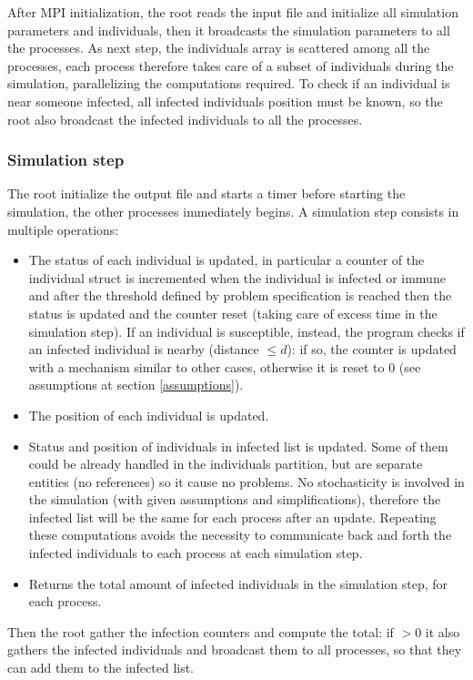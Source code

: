 \documentclass[10pt]{article}
\begin{document}
	After MPI initialization, the root reads the input file and initialize all simulation parameters and individuals, then it broadcasts the simulation parameters to all the processes. As next step, the individuals array is scattered among all the processes, each process therefore takes care of a subset of individuals during the simulation, parallelizing the computations required. To check if an individual is near someone infected, all infected individuals position must be known, so the root also broadcast the infected individuals to all the processes.
	
	\subsubsection{Simulation step}
	The root initialize the output file and starts a timer before starting the simulation, the other processes immediately begins. A simulation step consists in multiple operations:
	\begin{itemize}
		\item The status of each individual is updated, in particular a counter of the individual struct is incremented when the individual is infected or immune and after the threshold defined by problem specification is reached then the status is updated and the counter reset (taking care of excess time in the simulation step). If an individual is susceptible, instead, the program checks if an infected individual is nearby (distance $ \le d $): if so, the counter is updated with a mechanism similar to other cases, otherwise it is reset to 0 (see assumptions at section \ref{assumptions}).
		\item The position of each individual is updated.
		\item Status and position of individuals in infected list is updated. Some of them could be already handled in the individuals partition, but are separate entities (no references) so it cause no problems. No stochasticity is involved in the simulation (with given assumptions and simplifications), therefore the infected list will be the same for each process after an update. Repeating these computations avoids the necessity to communicate back and forth the infected individuals to each process at each simulation step.
		\item Returns the total amount of infected individuals in the simulation step, for each process. 
	\end{itemize}

	Then the root gather the infection counters and compute the total: if $ > 0 $ it also gathers the infected individuals and broadcast them to all processes, so that they can add them to the infected list.
	
\end{document}

